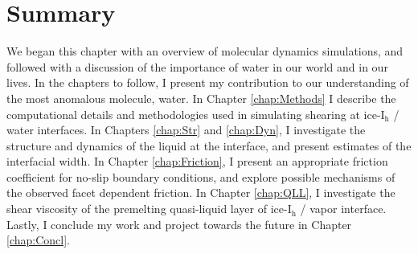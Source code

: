 



\section{Summary}
We began this chapter with an overview of molecular dynamics
simulations, and followed with a discussion of the importance of water
in our world and in our lives.  In the chapters to follow, I present
my contribution to our understanding of the most anomalous molecule,
water. In Chapter \ref{chap:Methods} I describe the computational
details and methodologies used in simulating shearing at
ice-I$_\mathrm{h}$ / water interfaces. In Chapters \ref{chap:Str} and
\ref{chap:Dyn}, I investigate the structure and dynamics of the liquid
at the interface, and present estimates of the interfacial width. In
Chapter \ref{chap:Friction}, I present an appropriate friction
coefficient for no-slip boundary conditions, and explore possible
mechanisms of the observed facet dependent friction. In Chapter
\ref{chap:QLL}, I investigate the shear viscosity of the premelting
quasi-liquid layer of ice-I$_\mathrm{h}$ / vapor interface. Lastly, I
conclude my work and project towards the future in Chapter
\ref{chap:Concl}.





